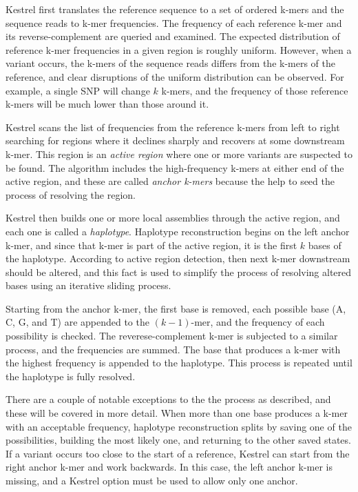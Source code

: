 Kestrel first translates the reference sequence to a set of ordered k-mers and the sequence reads to k-mer frequencies. The frequency of each reference k-mer and its reverse-complement are queried and examined. The expected distribution of reference k-mer frequencies in a given region is roughly uniform. However, when a variant occurs, the k-mers of the sequence reads differs from the k-mers of the reference, and clear disruptions of the uniform distribution can be observed. For example, a single SNP will change $k$ k-mers, and the frequency of those reference k-mers will be much lower than those around it.

Kestrel scans the list of frequencies from the reference k-mers from left to right searching for regions where it declines sharply and recovers at some downstream k-mer. This region is an \textit{active region} where one or more variants are suspected to be found. The algorithm includes the high-frequency k-mers at either end of the active region, and these are called \textit{anchor k-mers} because the help to seed the process of resolving the region.

Kestrel then builds one or more local assemblies through the active region, and each one is called a \textit{haplotype}. Haplotype reconstruction begins on the left anchor k-mer, and since that k-mer is part of the active region, it is the first $k$ bases of the haplotype. According to active region detection, then next k-mer downstream should be altered, and this fact is used to simplify the process of resolving altered bases using an iterative sliding process.

Starting from the anchor k-mer, the first base is removed, each possible base (A, C, G, and T) are appended to the $(k - 1)$-mer, and the frequency of each possibility is checked. The reverese-complement k-mer is subjected to a similar process, and the frequencies are summed. The base that produces a k-mer with the highest frequency is appended to the haplotype. This process is repeated until the haplotype is fully resolved.

There are a couple of notable exceptions to the the process as described, and these will be covered in more detail. When more than one base produces a k-mer with an acceptable frequency, haplotype reconstruction splits by saving one of the possibilities, building the most likely one, and returning to the other saved states. If a variant occurs too close to the start of a reference, Kestrel can start from the right anchor k-mer and work backwards. In this case, the left anchor k-mer is missing, and a Kestrel option must be used to allow only one anchor.

